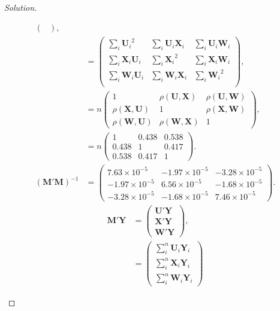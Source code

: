 \documentclass{amsart}
\newcommand{\bvec}[1]{{\boldsymbol #1}}
\begin{document}
\begin{proof}[Solution]
\begin{enumerate}[(a)]
\begin{align*}
\begin{pmatrix}
							\end{pmatrix}, \\
							&= \begin{pmatrix}
								\sum_{i}\bvec{U_{i}}^{2} & \sum_{i}\bvec{U_{i}}\bvec{X_{i}} & \sum_{i}\bvec{U_{i}}\bvec{W_{i}} \\
								\sum_{i}\bvec{X_{i}}\bvec{U_{i}} & \sum_{i}\bvec{X_{i}}^{2} & \sum_{i}\bvec{X_{i}}\bvec{W_{i}} \\
								\sum_{i}\bvec{W_{i}}\bvec{U_{i}} & \sum_{i}\bvec{W_{i}}\bvec{X_{i}} & \sum_{i}\bvec{W_{i}}^{2} \\
								\end{pmatrix}, \\
								&= n \begin{pmatrix}
									1 & \rho(\bvec{U},\bvec{X}) & \rho(\bvec{U},\bvec{W}) \\
									\rho(\bvec{X},\bvec{U}) & 1 & \rho(\bvec{X},\bvec{W}) \\
									\rho(\bvec{W},\bvec{U}) & \rho(\bvec{W},\bvec{X}) & 1
								\end{pmatrix}, \\
								&= n \begin{pmatrix}
									1 & 0.438 & 0.538 \\
									0.438 & 1 & 0.417 \\
									0.538 & 0.417 & 1
								\end{pmatrix}. \\
								(\bvec{M}'\bvec{M})^{-1} &= \begin{pmatrix}
									7.63 \times 10^{-5} & -1.97 \times 10^{-5} & -3.28 \times 10^{-5} \\
									-1.97 \times 10^{-5} & 6.56 \times 10^{-5} & -1.68 \times 10^{-5} \\
									-3.28 \times 10^{-5} & -1.68 \times 10^{-5} & 7.46 \times 10^{-5}
								\end{pmatrix}.
						\end{align*}
						\begin{align*}
							\bvec{M}'\bvec{Y} &= \begin{pmatrix}
								\bvec{U}'\bvec{Y} \\ \bvec{X}'\bvec{Y} \\ \bvec{W}'\bvec{Y}
							\end{pmatrix}, \\
							&= \begin{pmatrix}
								\sum_{i}^{n} \bvec{U}_{i}\bvec{Y}_{i} \\ \sum_{i}^{n} \bvec{X}_{i}\bvec{Y}_{i} \\ \sum_{i}^{n} \bvec{W}_{i}\bvec{Y}_{i}

\end{pmatrix}
\end{align*}
\end{enumerate}
\end{proof}
\end{document}

